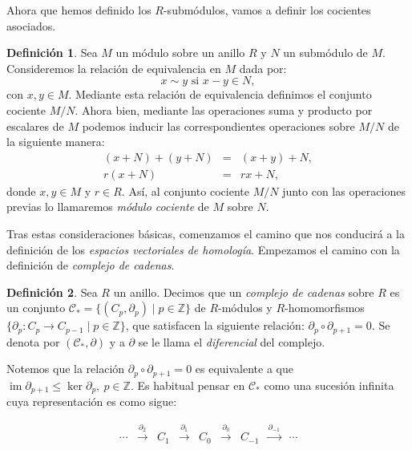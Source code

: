 \documentclass[12pt, a4paper, twoside]{book}
\numberwithin{equation}{section}
\theoremstyle{definition}
\newtheorem{defi}{Definición}[section]
\theoremstyle{remark}
\theoremstyle{plain}
\DeclareMathOperator{\Ima}{im}
\begin{document}
	Ahora que hemos definido los $R$-submódulos, vamos a definir los 
	cocientes asociados.

	\begin{defi}
		Sea $M$ un módulo sobre un anillo $R$ y $N$ un submódulo de 
		$M$. Consideremos la relación de equivalencia en $M$ dada por:
		$$
		x \sim y \text{ si } x-y \in N,
		$$
		con $x,y \in M$. Mediante esta relación de equivalencia 
		definimos el conjunto cociente $M/N$. Ahora bien, mediante las 
		operaciones suma y producto por escalares de $M$ podemos 
		inducir las correspondientes operaciones sobre $M/N$ de la 
		siguiente manera:
		\begin{equation*}
		\begin{array}{rll}
			(x+N)+(y+N) & = & (x+y)+N,\\
			r(x+N) & = & rx+N,
		\end{array}
		\end{equation*}
		donde $x,y \in M$ y $r \in R$. Así, al conjunto cociente 
		$M/N$ junto con las operaciones previas lo llamaremos 
		\textit{módulo cociente} de $M$ sobre $N$.
	\end{defi}

	Tras estas consideraciones básicas, comenzamos el camino que nos 
	conducirá a la definición de los \emph{espacios vectoriales de 
	homología}. Empezamos el camino con la definición de \emph{complejo de 
	cadenas}.

	\begin{defi}
	Sea $R$ un anillo. Decimos que un \textit{complejo de cadenas} sobre 
	$R$ 
	es un conjunto $\mathcal{C}_{*}=\{(C_{p},\partial_{p}) \mid p \in 
	\mathbb{Z}\}$
	de $R$-módulos y $R$-homomorfismos $\{\partial_{p}\colon C_{p} 
		\rightarrow 
	C_{p-1} \mid p \in \mathbb{Z}\}$, que satisfacen la siguiente 
	relación: $\partial_{p}\circ 
	\partial_{p+1}=0$. Se denota por $(\mathcal{C}_{*},\partial)$ y a 
	$\partial$ se le llama el \textit{diferencial} del complejo.
	\end{defi}

	Notemos que la relación $\partial_{p}\circ \partial_{p+1}=0$ es 
	equivalente a que 
	$\Ima \partial_{p+1} \leq \ker \partial_{p},\ p \in \mathbb{Z}$. Es 
	habitual pensar en $\mathcal{C}_{*}$ como una sucesión infinita cuya
	representación es como sigue:

	\begin{equation*}
		 \left.
		\begin{array}{ccccccccc}
			\cdots & \overset{\partial_{2}}{\longrightarrow} & C_{1}& 
			\overset{\partial_{1}}{\longrightarrow} & C_{0} 
					& \overset{\partial_{0}}{\longrightarrow}
			& C_{-1} & 
			\overset{\partial_{-1}}{\longrightarrow} & \cdots 
		\end{array}
		\right. 
	\end{equation*}
\end{document}
